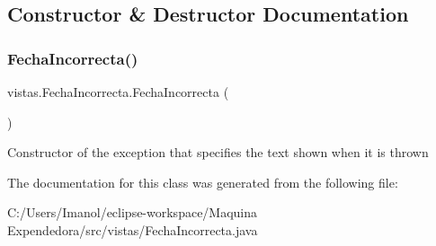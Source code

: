 \subsection{Constructor \& Destructor Documentation}
\mbox{\label{classvistas_1_1_fecha_incorrecta_a665fd9b590023e898707e58c08a4b8e2}} 
\subsubsection{\texorpdfstring{Fecha\+Incorrecta()}{FechaIncorrecta()}}
{\footnotesize\ttfamily vistas.\+Fecha\+Incorrecta.\+Fecha\+Incorrecta (\begin{DoxyParamCaption}{ }\end{DoxyParamCaption})}

Constructor of the exception that specifies the text shown when it is thrown 

The documentation for this class was generated from the following file\+:\begin{DoxyCompactItemize}
\item 
C\+:/\+Users/\+Imanol/eclipse-\/workspace/\+Maquina Expendedora/src/vistas/Fecha\+Incorrecta.\+java\end{DoxyCompactItemize}
